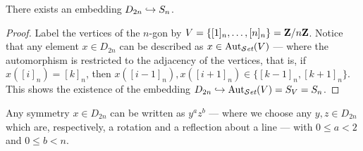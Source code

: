 \begin{proposition}\label{prop: dihetral-to-sym}
  There exists an embedding \(D_{2n} \hookrightarrow S_n\).
\end{proposition}

\begin{proof}
  Label the vertices of the \(n\)-gon by \(V = \{[1]_n, \dots, [n]_n\} =
  \mathbf{Z}/n\mathbf{Z}\). Notice that any element \(x \in D_{2n}\) can be described as \(x \in
  \operatorname{Aut}_{\mathcal{S}\textit{et}}(V)\) --- where the automorphism is restricted to the adjacency of
  the vertices, that is, if \(x([i]_n) = [k]_n\), then \(x([i - 1]_n), x([i +
  1]_n) \in \{[k - 1]_n, [k + 1]_n\}\). This shows the existence of the
  embedding \(D_{2n} \hookrightarrow \operatorname{Aut}_{\mathcal{S}\textit{et}}(V) = S_V = S_n\).
\end{proof}

\begin{proposition}
  Any symmetry \(x \in D_{2n}\) can be written as \(y^a z^b\) --- where we
  choose any \(y, z \in D_{2n}\) which are, respectively, a rotation and a
  reflection about a line --- with \(0 \leq a < 2\) and \(0 \leq b < n\).
\end{proposition}

